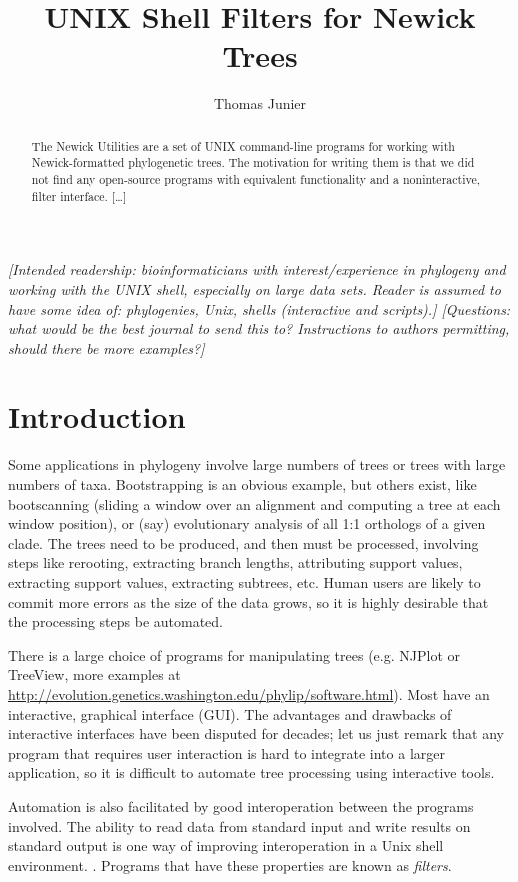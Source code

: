 \documentclass[a4paper,11pt]{article}
\title{UNIX Shell Filters for Newick Trees}
\author{Thomas Junier}
\newcommand{\gui}{\textsc{GUI}}
\newcommand{\unix}{Unix}
\begin{document}
\maketitle

\begin{abstract}
The Newick Utilities are a set of UNIX command-line programs for working with
Newick-formatted phylogenetic trees. The motivation for writing them is that we did not find any open-source programs with equivalent functionality and a noninteractive, filter interface. [\ldots]
\end{abstract}

\textit{\noindent{} [Intended readership: bioinformaticians with interest/experience in phylogeny and working with the UNIX shell, especially on large data sets. Reader is assumed to have some idea of: phylogenies, Unix, shells (interactive and scripts).]
[Questions: what would be the best journal to send this to? Instructions to authors permitting, should there be more examples?]}
 
\section*{Introduction}

Some applications in phylogeny involve large numbers of trees or trees with large numbers of taxa. Bootstrapping is an obvious example, but others exist, like bootscanning (sliding a window over an alignment and computing a tree at each window position), or (say) evolutionary analysis of all 1:1 orthologs of a given clade. The trees need to be produced, and then must be processed, involving steps like rerooting, extracting branch lengths, attributing support values, extracting support values, extracting subtrees, etc. Human users are likely to commit more errors as the size of the data grows, so it is highly desirable that the processing steps be automated. 

There is a large choice of programs for manipulating trees (e.g.
NJPlot or TreeView, more examples at \url{
http://evolution.genetics.washington.edu/phylip/software.html}). Most have an interactive, graphical interface (\gui{}). The advantages and drawbacks of interactive interfaces have been disputed for decades; let us just remark that any program that requires user interaction is hard to integrate into a larger application, so it is difficult to automate tree processing using interactive tools.

Automation is also facilitated by good interoperation between the programs involved. The ability to read data from standard input and write results on standard output is one way of improving interoperation in a \unix{} shell environment. \cite{Gancarz2002}. Programs that have these properties are known as \textit{filters}.
\end{document}
